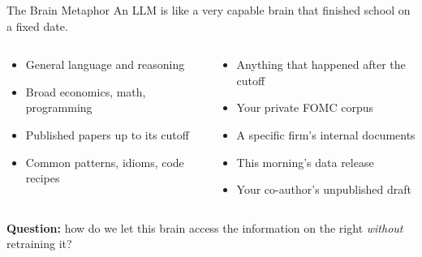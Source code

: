 \begin{frame}{The Brain Metaphor}
An LLM is like a very capable brain that finished school on a fixed date.

\medskip
\begin{columns}[T]
\begin{tcolorbox}[colback=green!5, colframe=green!40!black, title=\textbf{What the brain knows}]
\begin{itemize}
\item General language and reasoning
\item Broad economics, math, programming
\item Published papers up to its cutoff
\item Common patterns, idioms, code recipes
\end{itemize}
\end{tcolorbox}

\begin{tcolorbox}[colback=red!5, colframe=red!50!black, title=\textbf{What the brain does \emph{not} know}]
\begin{itemize}
\item Anything that happened after the cutoff
\item Your private FOMC corpus
\item A specific firm's internal documents
\item This morning's data release
\item Your co-author's unpublished draft
\end{itemize}
\end{tcolorbox}
\end{columns}

\medskip
\textbf{Question:} how do we let this brain access the information on the right \emph{without} retraining it?
\end{frame}

